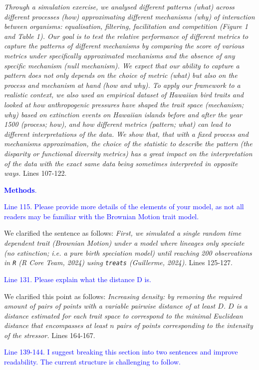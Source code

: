 \documentclass[
]{article}
\begin{document}
\textit{Through a simulation exercise, we analysed different patterns (what) across different processes (how) approximating different mechanisms (why) of interaction between organisms: equalisation, filtering, facilitation and competition (Figure 1 and Table 1).
Our goal is to test the relative performance of different metrics to capture the patterns of different mechanisms by comparing the score of various metrics under specifically approximated mechanisms and the absence of any specific mechanism (null mechanism).
We expect that our ability to capture a pattern does not only depends on the choice of metric (what) but also on the process and mechanism at hand (how and why).
To apply our framework to a realistic context, we also used an empirical dataset of Hawaiian bird traits and looked at how anthropogenic pressures have shaped the trait space (mechanism; why) based on extinction events on Hawaiian islands before and after the year 1500 (process; how), and how different metrics (pattern; what) can lead to different interpretations of the data.
We show that, that with a fixed process and mechanisms approximation, the choice of the statistic to describe the pattern (the disparity or functional diversity metrics) has a great impact on the interpretation of the data with the exact same data being sometimes interpreted in opposite ways.}
Lines 107-122.

\textcolor{blue}{\textbf{Methods}.}

\textcolor{blue}{Line 115. Please provide more details of the elements of your model, as not all readers may be familiar with the Brownian Motion trait model.}

We clarified the sentence as follows:
\textit{First, we simulated a single random time dependent trait (Brownian Motion) under a model where lineages only speciate (no extinction; i.e. a pure birth speciation model) until reaching 200 observations in \texttt{R} (R Core Team, 2024) using \texttt{treats} (Guillerme, 2024).}
Lines 125-127.

\textcolor{blue}{Line 131. Please explain what the distance D is.}

We clarified this point as follows:
\textit{Increasing density: by removing the required amount of pairs of points with a variable pairwise distance of at least $D$.
$D$ is a distance estimated for each trait space to correspond to the minimal Euclidean distance that encompasses at least $n$ pairs of points corresponding to the intensity of the stressor.}
Lines 164-167.

\textcolor{blue}{Line 139-144. I suggest breaking this section into two sentences and improve readability.
The current structure is challenging to follow.}
\end{document}
